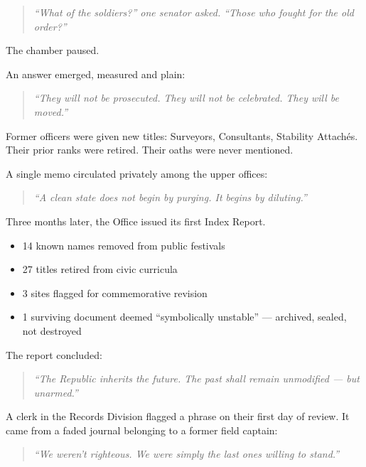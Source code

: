 \documentclass[9pt]{article}
\begin{document}
\begin{quote}
\textit{“What of the soldiers?” one senator asked. “Those who fought for the old order?”}
\end{quote}

The chamber paused.

An answer emerged, measured and plain:

\begin{quote}
\textit{“They will not be prosecuted. They will not be celebrated. They will be moved.”}
\end{quote}

Former officers were given new titles: Surveyors, Consultants, Stability Attachés. Their prior ranks were retired. Their oaths were never mentioned.

A single memo circulated privately among the upper offices:

\begin{quote}
\textit{“A clean state does not begin by purging. It begins by diluting.”}
\end{quote}

\vspace{1em}

Three months later, the Office issued its first Index Report.

\begin{itemize}
    \item 14 known names removed from public festivals
    \item 27 titles retired from civic curricula
    \item 3 sites flagged for commemorative revision
    \item 1 surviving document deemed ``symbolically unstable'' --- archived, sealed, not destroyed
\end{itemize}

The report concluded:

\begin{quote}
\textit{“The Republic inherits the future. The past shall remain unmodified --- but unarmed.”}
\end{quote}

\vspace{1em}

A clerk in the Records Division flagged a phrase on their first day of review. It came from a faded journal belonging to a former field captain:

\begin{quote}
\textit{“We weren’t righteous. We were simply the last ones willing to stand.”}
\end{quote}
\end{document}
